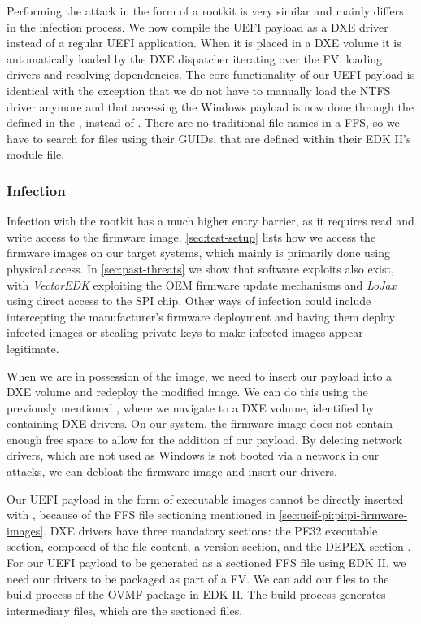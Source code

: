 Performing the attack in the form of a rootkit is very similar and mainly differs in the infection process.
We now compile the \ac{UEFI} payload as a \ac{DXE} driver instead of a regular \ac{UEFI} application.
When it is placed in a \ac{DXE} volume it is automatically loaded by the \ac{DXE} dispatcher iterating over the \ac{FV}, loading drivers and resolving dependencies.
The core functionality of our \ac{UEFI} payload is identical with the exception that we do not have to manually load the \ac{NTFS} driver anymore and that accessing the Windows payload is now done through the  defined in the \cite[Section 3.4.1]{pi-spec}, instead of .
There are no traditional file names in a \ac{FFS}, so we have to search for files using their \acp{GUID}, that are defined within their \ac{EDK} II's module file.

\subsubsection{Infection}

Infection with the rootkit has a much higher entry barrier, as it requires read and write access to the firmware image.
\autoref{sec:test-setup} lists how we access the firmware images on our target systems, which mainly is primarily done using physical access.
In \autoref{sec:past-threats} we show that software exploits also exist, with \emph{VectorEDK} exploiting the \ac{OEM} firmware update mechanisms and \emph{LoJax} using direct access to the \ac{SPI} chip.
Other ways of infection could include intercepting the manufacturer's firmware deployment and having them deploy infected images or stealing private keys to make infected images appear legitimate.

When we are in possession of the image, we need to insert our payload into a \ac{DXE} volume and redeploy the modified image.
We can do this using the previously mentioned , where we navigate to a \ac{DXE} volume, identified by containing \ac{DXE} drivers.
On our  system, the firmware image does not contain enough free space to allow for the addition of our payload.
By deleting network drivers, which are not used as Windows is not booted via a network in our attacks, we can debloat the firmware image and insert our drivers.

Our \ac{UEFI} payload in the form of  executable images cannot be directly inserted with , because of the \ac{FFS} file sectioning mentioned in \autoref{sec:ueif-pi:pi:pi-firmware-images}.
\ac{DXE} drivers have three mandatory sections: the \ac{PE32} executable section, composed of the  file content, a version section, and the \ac{DEPEX} section \cite[Vol. 3, 2.1.4.1.4]{pi-spec}.
For our \ac{UEFI} payload to be generated as a sectioned \ac{FFS} file using \ac{EDK} II, we need our drivers to be packaged as part of a \ac{FV}.
We can add our files to the build process of the \ac{OVMF} package in \ac{EDK} II.
The build process generates intermediary  files, which are the sectioned files.

